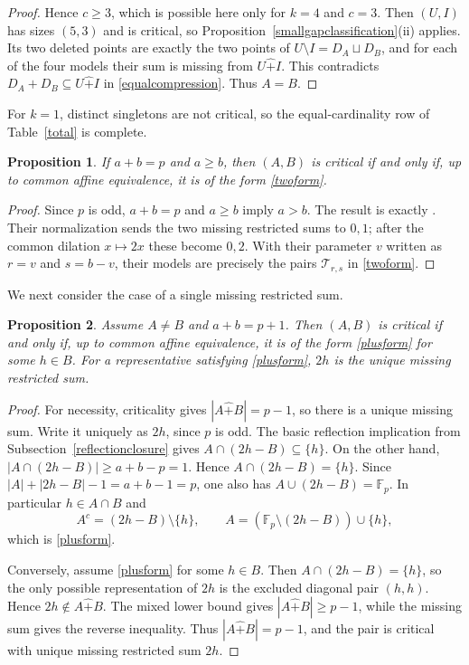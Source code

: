 \documentclass[10pt,a4paper]{amsart}
\newtheorem{proposition}{Proposition}[section]
\newcommand{\F}{\mathbb{F}_p}
\newcommand{\rs}{\mathbin{\widehat+}}
\begin{document}
\begin{proof}
Hence $c\ge3$, which is possible here only for $k=4$ and $c=3$.
Then $(U,I)$ has sizes $(5,3)$ and is critical, so
Proposition~\ref{smallgapclassification}(ii) applies.  Its two deleted
points are exactly the two points of $U\setminus I=D_A\sqcup D_B$, and
for each of the four models their sum is missing from $U\rs I$.  This
contradicts $D_A+D_B\subseteq U\rs I$ in \eqref{equalcompression}.
Thus $A=B$.
\end{proof}

For $k=1$, distinct singletons are not critical, so the equal-cardinality
row of Table~\ref{total} is complete.

\begin{proposition}\label{twomissingclassification}
If $a+b=p$ and $a\ge b$, then $(A,B)$ is critical if and only if,
up to common affine equivalence, it is of the form \eqref{twoform}.
\end{proposition}
\begin{proof}
Since $p$ is odd, $a+b=p$ and $a\ge b$ imply $a>b$.  The result is
exactly \cite[Theorem 1.1]{HLY}.  Their normalization sends the two
missing restricted sums to $0,1$; after the common dilation
$x\mapsto2x$ these become $0,2$.  With their parameter $v$ written as
$r=v$ and $s=b-v$, their models are precisely the pairs
$\mathcal T_{r,s}$ in \eqref{twoform}.
\end{proof}

We next consider the case of a single missing restricted sum.

\begin{proposition}\label{pplus}
Assume $A\ne B$ and $a+b=p+1$.  Then $(A,B)$ is critical if and only if,
up to common affine equivalence, it is of the form \eqref{plusform} for
some $h\in B$.  For a representative satisfying \eqref{plusform}, $2h$
is the unique missing restricted sum.
\end{proposition}
\begin{proof}
For necessity, criticality gives $|A\rs B|=p-1$, so there is a unique
missing sum.  Write it uniquely as $2h$, since $p$ is odd.
The basic reflection implication from Subsection~\ref{reflectionclosure}
gives $A\cap(2h-B)\subseteq\{h\}$.  On the other hand,
$|A\cap(2h-B)|\ge a+b-p=1$.  Hence $A\cap(2h-B)=\{h\}$.  Since
$|A|+|2h-B|-1=a+b-1=p$, one also has $A\cup(2h-B)=\F$.  In particular $h\in A\cap B$ and
\[
 A^c=(2h-B)\setminus\{h\},\qquad
 A=(\F\setminus(2h-B))\cup\{h\},
\]
which is \eqref{plusform}.

Conversely, assume \eqref{plusform} for some $h\in B$.  Then
$A\cap(2h-B)=\{h\}$, so the only possible representation of $2h$ is
the excluded diagonal pair $(h,h)$.  Hence $2h\notin A\rs B$.
The mixed lower bound gives $|A\rs B|\ge p-1$, while the missing sum
gives the reverse inequality.  Thus $|A\rs B|=p-1$, and the pair is
critical with unique missing restricted sum $2h$.
\end{proof}
\end{document}
